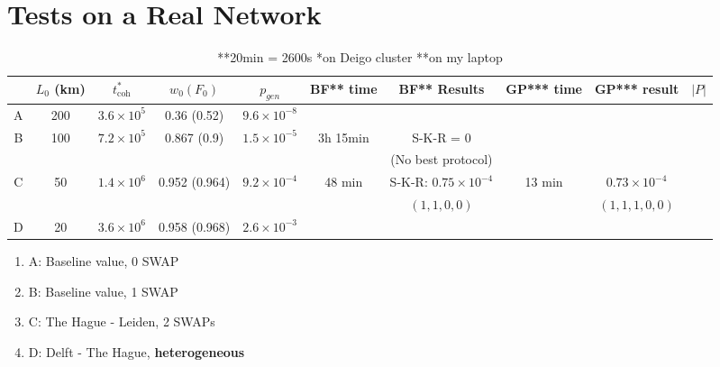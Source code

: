 \documentclass{article}
\begin{document}
\section*{Tests on a Real Network}

\begin{table}[h!]
    \centering
    \begin{tabular}{|c|c|c|c|c|c|c|c|c|c|}
        \hline
        & $L_0$ (km) & $t_{\text{coh}}^*$ & $w_0 (F_0)$ & $p_{gen}$ & BF** time & BF** Results & GP*** time & GP*** result & $|P|$ \\
        \hline
        \hline
        A & 200  & $3.6 \times 10^5$ & 0.36 (0.52) & $9.6 \times 10^{-8}$ & & & & & \\
        \hline
        B & 100  & $7.2 \times 10^5$ & 0.867 (0.9) & $1.5 \times 10^{-5}$ & 3h 15min & S-K-R = 0 & & & \\
        & & & & & & (No best protocol) & & & \\
        \hline
        C & 50  & $1.4 \times 10^6$ & 0.952 (0.964) & $9.2 \times 10^{-4}$ & 48 min & S-K-R: $0.75 \times 10^{-4}$ & 13 min & $0.73 \times 10^{-4}$ & \\
        & & & & & & $(1,1,0,0)$ & & $(1,1,1,0,0)$ & \\
        \hline
        D & 20  & $3.6 \times 10^6$ & 0.958 (0.968) & $2.6 \times 10^{-3}$ & & & & & \\
        \hline
    \end{tabular}
    \caption{**20min = 2600s \quad **on Deigo cluster \quad ***on my laptop}
\end{table}

\begin{enumerate}
    \item A: Baseline value, 0 SWAP
    \item B: Baseline value, 1 SWAP
    \item C: The Hague - Leiden, 2 SWAPs
    \item D: Delft - The Hague, \textbf{heterogeneous}
\end{enumerate}
\end{document}
